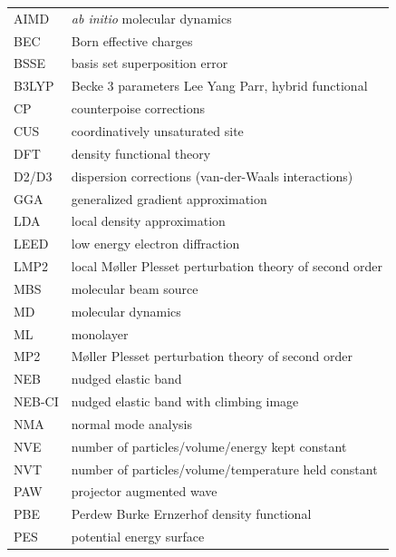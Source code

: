 \documentclass[11pt,DIV=13,BCOR=5mm,a4paper,headinclude]{scrbook}
\begin{document}
\clearpage
{}
\begin{table}[!h]
 \centering
  \begin{tabular}{ll}
AIMD & \textit{ab initio} molecular dynamics\\
BEC & Born effective charges\\
BSSE & basis set superposition error\\
B3LYP & Becke 3 parameters Lee Yang Parr, hybrid functional\\
CP & counterpoise corrections\\
CUS & coordinatively unsaturated site\\
DFT & density functional theory\\
D2/D3 & dispersion corrections (van-der-Waals interactions)\\
GGA & generalized gradient approximation\\
LDA & local density approximation\\
LEED & low energy electron diffraction\\
LMP2 & local M\o{}ller Plesset perturbation theory of second order\\
MBS & molecular beam source\\
MD & molecular dynamics\\
ML & monolayer\\
MP2 & M\o{}ller Plesset perturbation theory of second order\\
NEB & nudged elastic band\\
NEB-CI & nudged elastic band with climbing image\\
NMA & normal mode analysis\\
NVE & number of particles/volume/energy kept constant\\
NVT & number of particles/volume/temperature held constant\\
PAW & projector augmented wave\\
PBE & Perdew Burke Ernzerhof density functional\\
PES & potential energy surface\\

\end{tabular}
\end{table}
\end{document}
